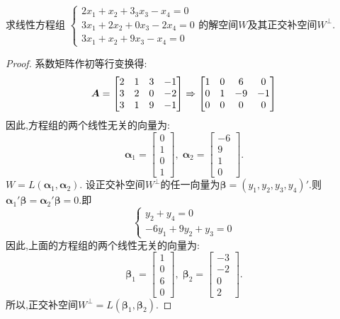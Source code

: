 \documentclass[lang=cn,11pt,normal]{elegantbook}
\renewcommand{\AA}{\boldsymbol{A}}
\begin{document}
	\begin{exercise}
		求线性方程组
		$
		\begin{cases}
		2x_1+x_2+3_3x_3-x_4=0\\
		3x_1+2x_2+0x_3-2x_4=0\\
		3x_1+x_2+9x_3-x_4=0
		\end{cases}
		$的解空间$W$及其正交补空间$W^{\perp}$.
	\end{exercise}
	\begin{proof}
		系数矩阵作初等行变换得:
		\begin{equation}
		\AA=
		\begin{bmatrix}
		2&1&3&-1\\
		3&2&0&-2\\
		3&1&9&-1
		\end{bmatrix}
		\xRightarrow{}
		\begin{bmatrix}
		1&0&6&0\\
		0&1&-9&-1\\
		0&0&0&0
		\end{bmatrix}
		\end{equation}
		因此,方程组的两个线性无关的向量为:
		\begin{equation}
		\boldsymbol{\alpha}_1=
		\begin{bmatrix}
		0\\1\\0\\1
		\end{bmatrix},\;
		\boldsymbol{\alpha}_2=
		\begin{bmatrix}
		-6\\9\\1\\0
		\end{bmatrix}.
		\end{equation}
		$W=L(\boldsymbol{\alpha}_1,\boldsymbol{\alpha}_2)$.
		设正交补空间$W^\perp$的任一向量为$\boldsymbol{\beta}=(y_1,y_2,y_3,y_4)'$.则$\boldsymbol{\alpha}_1'\boldsymbol{\beta}=\boldsymbol{\alpha}_2'\boldsymbol{\beta}=0$.即
		\begin{equation}
		\begin{cases}
		y_2+y_4=0\\
		-6y_1+9y_2+y_3=0
		\end{cases}
		\end{equation}
		因此,上面的方程组的两个线性无关的向量为:
		\begin{equation}
		\boldsymbol{\beta}_1=
		\begin{bmatrix}
		1\\0\\6\\0
		\end{bmatrix},\;
		\boldsymbol{\beta}_2=
		\begin{bmatrix}
		-3\\-2\\0\\2
		\end{bmatrix}.
		\end{equation}
		所以,正交补空间$W^\perp=L(\boldsymbol{\beta}_1,\boldsymbol{\beta}_2)$.
	\end{proof}
\end{document}

